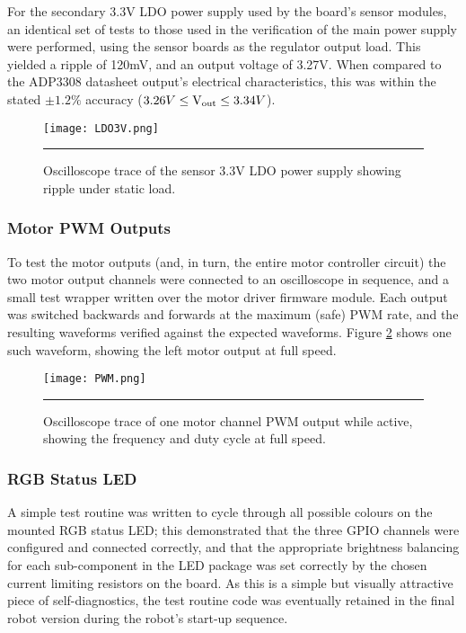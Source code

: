 For the secondary 3.3V LDO power supply used by the board's sensor modules, an identical set of tests to those used in the verification of the main power supply were performed, using the sensor boards as the regulator output load. This yielded a ripple of 120mV, and an output voltage of 3.27V. When compared to the ADP3308 datasheet output's electrical characteristics, this was within the stated \(\pm1.2\%\) accuracy (\(3.26V\leq\text{V\ensuremath{_{\textrm{out}}}}\leq3.34V\)).

\begin{figure}[tbph]
	\vspace{1em}
	\centering
		\texttt{[image: LDO3V.png]}
	\rule{35em}{0.5pt}
	\caption[LDO 3.3V Power Supply Oscilloscope Trace]{Oscilloscope trace of the sensor 3.3V LDO power supply showing ripple under static load.}
	\label{fig:sensorpowerripple}
\end{figure}

\FloatBarrier
\subsubsection{Motor PWM Outputs}

To test the motor outputs (and, in turn, the entire motor controller circuit) the two motor output channels were connected to an oscilloscope in sequence, and a small test wrapper written over the motor driver firmware module. Each output was switched backwards and forwards at the maximum (safe) PWM rate, and the resulting waveforms verified against the expected waveforms. Figure \ref{fig:motorpwm} shows one such waveform, showing the left motor output at full speed.

\begin{figure}[tbph]
	\vspace{1em}
	\centering
		\texttt{[image: PWM.png]}
	\rule{35em}{0.5pt}
	\caption[Motor PWM Oscilloscope Trace]{Oscilloscope trace of one motor channel PWM output while active, showing the frequency and duty cycle at full speed.}
	\label{fig:motorpwm}
\end{figure}

\FloatBarrier
\subsubsection{RGB Status LED}

A simple test routine was written to cycle through all possible colours on the mounted RGB status LED; this demonstrated that the three GPIO channels were configured and connected correctly, and that the appropriate brightness balancing for each sub-component in the LED package was set correctly by the chosen current limiting resistors on the board. As this is a simple but visually attractive piece of self-diagnostics, the test routine code was eventually retained in the final robot version during the robot's start-up sequence.


